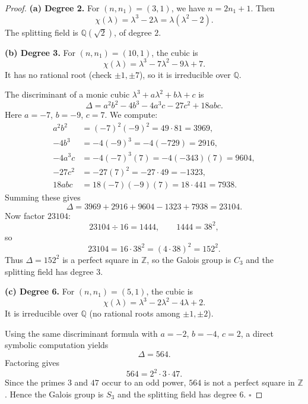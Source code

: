 \documentclass[11pt]{amsart}
\begin{document}
\begin{proof}
\textbf{(a) Degree 2.}  
For $(n,n_1) = (3,1)$, we have $n = 2n_1 + 1$. Then
\[
\chi(\lambda) = \lambda^3 - 2\lambda = \lambda(\lambda^2 - 2).
\]
The splitting field is $\mathbb{Q}(\sqrt{2})$, of degree $2$.

\textbf{(b) Degree 3.}  
For $(n,n_1) = (10,1)$, the cubic is
\[
\chi(\lambda) = \lambda^3 - 7\lambda^2 - 9\lambda + 7.
\]
It has no rational root (check $\pm1,\pm7$), so it is irreducible over $\mathbb{Q}$.

The discriminant of a monic cubic $\lambda^3 + a\lambda^2 + b\lambda + c$ is
\[
\Delta = a^2b^2 - 4b^3 - 4a^3c - 27c^2 + 18abc.
\]
Here $a = -7$, $b = -9$, $c = 7$. We compute:
\[
\begin{aligned}
a^2b^2 &= (-7)^2(-9)^2 = 49 \cdot 81 = 3969, \\
-4b^3 &= -4(-9)^3 = -4(-729) = 2916, \\
-4a^3c &= -4(-7)^3(7) = -4(-343)(7) = 9604, \\
-27c^2 &= -27(7)^2 = -27 \cdot 49 = -1323, \\
18abc &= 18(-7)(-9)(7) = 18 \cdot 441 = 7938.
\end{aligned}
\]
Summing these gives
\[
\Delta = 3969 + 2916 + 9604 - 1323 + 7938 = 23104.
\]
Now factor $23104$:
\[
23104 \div 16 = 1444, \qquad 1444 = 38^2,
\]
so
\[
23104 = 16 \cdot 38^2 = (4 \cdot 38)^2 = 152^2.
\]
Thus $\Delta = 152^2$ is a perfect square in $\mathbb{Z}$, so the Galois group is $C_3$ and the splitting field has degree $3$.

\textbf{(c) Degree 6.}  
For $(n,n_1) = (5,1)$, the cubic is
\[
\chi(\lambda) = \lambda^3 - 2\lambda^2 - 4\lambda + 2.
\]
It is irreducible over $\mathbb{Q}$ (no rational roots among $\pm1, \pm2$).

Using the same discriminant formula with $a = -2$, $b = -4$, $c = 2$, a direct symbolic computation  yields
\[
\Delta = 564.
\]
Factoring gives
\[
564  = 2^2 \cdot 3 \cdot 47.
\]
Since the primes $3$ and $47$ occur to an odd power, $564$ is not a perfect square in $\mathbb{Z}$. Hence the Galois group is $S_3$ and the splitting field has degree $6$. \hfill $\square$
\end{proof}
\end{document}

